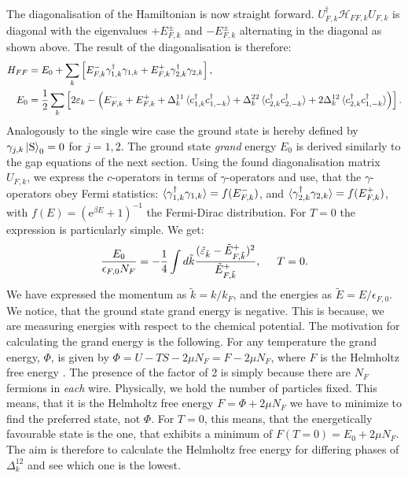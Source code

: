 The diagonalisation of the Hamiltonian is now straight forward. $U^\dagger_{F,k}\mathcal{H}_{FF,k}U_{F,k}$ is diagonal with the eigenvalues $+E^{\pm}_{F,k}$ and $-E^{\pm}_{F,k}$ alternating in the diagonal as shown above. The result of the diagonalisation is therefore:
\begin{align}
H_{FF} &= E_0 + \sum_{k} \left[ E^{-}_{F,k}\gamma^\dagger_{1, k}\gamma_{1, k} + E^{+}_{F,k}\gamma^\dagger_{2, k}\gamma_{2, k} \right], \nonumber \\ 
E_0 &= \frac{1}{2}\sum_k \left[2\varepsilon_k - \left( E^{-}_{F,k} + E^{+}_{F,k} + \Delta^{11}_k\braket{c^\dagger_{1,k}c^\dagger_{1,-k}} + \Delta^{22}_k\braket{c^\dagger_{2,k}c^\dagger_{2,-k}} + 2\Delta^{12}_k\braket{c^\dagger_{2,k}c^\dagger_{1,-k}} \right) \right]. 
\label{eq.2wiresDiagonalisedHamiltonian}
\end{align}  
Analogously to the single wire case the ground state is hereby defined by $\gamma_{j,k}\ket{\text{S}}_0 = 0$ for $j = 1, 2$. The ground state \textit{grand} energy $E_0$ is derived similarly to the gap equations of the next section. Using the found diagonalisation matrix $U_{F,k}$, we express the $c$-operators in terms of $\gamma$-operators and use, that the $\gamma$-operators obey Fermi statistics: $\braket{\gamma^\dagger_{1,k}\gamma_{1,k}} = f(E^{-}_{F,k})$, and $\braket{\gamma^\dagger_{2,k}\gamma_{2,k}} = f(E^{+}_{F,k})$, with $f(E) = (\text{e}^{\beta E} + 1)^{-1}$ the Fermi-Dirac distribution. For $T=0$ the expression is particularly simple. We get:
\begin{equation}
\frac{E_0}{\epsilon_{F,0} N_F} = -\frac{1}{4} \int d\tilde{k} \frac{(\tilde{\varepsilon}_{\tilde{k}} - \tilde{E}^{+}_{F, \tilde{k}})^2}{\tilde{E}^{+}_{F, \tilde{k}}}, \hspace{0.5cm} T = 0. 
\label{eq.2wiresGrandGroundStateEnergy}
\end{equation}
We have expressed the momentum as $\tilde{k} = k/k_F$, and the energies as $\tilde{E} = E/\epsilon_{F,0}$. We notice, that the ground state grand energy is negative. This is because, we are measuring energies with respect to the chemical potential. The motivation for calculating the grand energy is the following. For any temperature the grand energy, $\Phi$, is given by $\Phi = U - TS - 2\mu N_F = F - 2\mu N_F$, where $F$ is the Helmholtz free energy \cite[pp. 161-162]{SchroederThermal}. The presence of the factor of 2 is simply because there are $N_F$ fermions in \textit{each} wire. Physically, we hold the number of particles fixed. This means, that it is the Helmholtz free energy $F = \Phi + 2\mu N_F$ we have to minimize to find the preferred state, not $\Phi$. For $T = 0$, this means, that the energetically favourable state is the one, that exhibits a minimum of $F(T = 0) = E_0 + 2\mu N_F$. The aim is therefore to calculate the Helmholtz free energy for differing phases of $\Delta^{12}_k$ and see which one is the lowest. 

